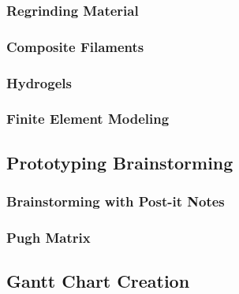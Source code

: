 \subsubsection{Regrinding Material\label{sec:methedology:pivoting:alternativeApproaches:regrindingMaterial}}

\subsubsection{Composite Filaments\label{sec:methedology:pivoting:alternativeApproaches:compositeFilaments}}

\subsubsection{Hydrogels\label{sec:methedology:pivoting:alternativeApproaches:hydrogels}}

\subsubsection{Finite Element Modeling\label{sec:methedology:pivoting:alternativeApproaches:fem}}

\subsection{Prototyping Brainstorming\label{sec:methedology:pivoting:prototypingBrainstorming}}

\subsubsection{Brainstorming with Post-it Notes\label{sec:methedology:pivoting:prototypingBrainstorming:postItNotes}}

\subsubsection{Pugh Matrix\label{sec:methedology:pivoting:prototypingBrainstorming:pughMatrix}}

\subsection{Gantt Chart Creation\label{sec:methedology:pivoting:ganttChartCreation}}

